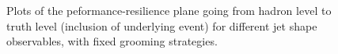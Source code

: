 \documentclass[11pt]{cernrep}
\begin{document}
\begin{figure}
  \caption{Plots of the peformance-resilience plane going from hadron level to truth level (inclusion of underlying event) for different jet shape observables, with fixed grooming strategies.}\label{jetsub_2prong_fig:shapes-UE}
\end{figure}
\end{document}
